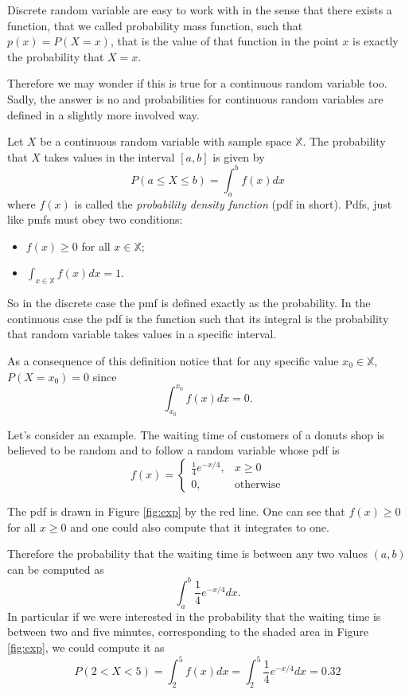 \documentclass[
]{book}
\begin{document}
Discrete random variable are easy to work with in the sense that there exists a function, that we called probability mass function, such that \(p(x)=P(X=x)\), that is the value of that function in the point \(x\) is exactly the probability that \(X=x\).

Therefore we may wonder if this is true for a continuous random variable too. Sadly, the answer is no and probabilities for continuous random variables are defined in a slightly more involved way.

Let \(X\) be a continuous random variable with sample space \(\mathbb{X}\). The probability that \(X\) takes values in the interval \([a,b]\) is given by
\[
P(a\leq X \leq b) = \int_{a}^bf(x)dx
\]
where \(f(x)\) is called the \emph{probability density function} (pdf in short). Pdfs, just like pmfs must obey two conditions:

\begin{itemize}
\item
  \(f(x)\geq 0\) for all \(x\in\mathbb{X}\);
\item
  \(\int_{x\in\mathbb{X}}f(x)dx=1\).
\end{itemize}

So in the discrete case the pmf is defined exactly as the probability. In the continuous case the pdf is the function such that its integral is the probability that random variable takes values in a specific interval.

As a consequence of this definition notice that for any specific value \(x_0\in\mathbb{X}\), \(P(X=x_0)=0\) since
\[
\int_{x_0}^{x_0}f(x)dx = 0.
\]

Let's consider an example. The waiting time of customers of a donuts shop is believed to be random and to follow a random variable whose pdf is
\[
f(x) = \left\{
\begin{array}{ll}
\frac{1}{4}e^{-x/4}, & x\geq 0\\
0, & \mbox{otherwise}
\end{array}
\right.
\]

The pdf is drawn in Figure \ref{fig:exp} by the red line. One can see that \(f(x)\geq 0\) for all \(x\geq 0\) and one could also compute that it integrates to one.

Therefore the probability that the waiting time is between any two values \((a,b)\) can be computed as
\[
\int_a^b\frac{1}{4}e^{-x/4}dx.
\]
In particular if we were interested in the probability that the waiting time is between two and five minutes, corresponding to the shaded area in Figure \ref{fig:exp}, we could compute it as
\[
P(2<X<5)=\int_2^5f(x)dx=\int_{2}^5\frac{1}{4}e^{-x/4}dx= 0.32
\]
\end{document}
